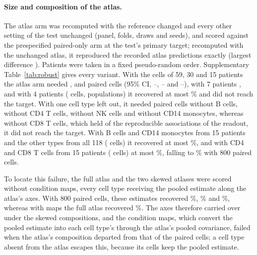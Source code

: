 \paragraph{Size and composition of the atlas.} The atlas arm was recomputed with the reference changed and every other setting of the test unchanged (panel, folds, draws and seeds), and scored against the prespecified paired-only arm at the test's primary target; recomputed with the unchanged atlas, it reproduced the recorded atlas predictions exactly (largest difference \RbReproduces). Patients were taken in a fixed pseudo-random order. Supplementary Table~\ref{tab:robust} gives every variant. With the cells of 59, 30 and 15 patients the atlas arm needed \RbCellsPatientsFiftyNine, \RbCellsPatientsThirty{} and \RbCellsPatientsFifteen{} paired cells (95\% CI, \RbCellsPatientsFiftyNineLo--\RbCellsPatientsFiftyNineHi, \RbCellsPatientsThirtyLo--\RbCellsPatientsThirtyHi{} and \RbCellsPatientsFifteenLo--\RbCellsPatientsFifteenHi), with 7 patients \RbCellsPatientsSeven, and with 4 patients (\RbCellCountPatientsFour{} cells, \RbPopsPatientsFour{} populations) it recovered at most \RbRfMaxPatientsFour\% and did not reach the target. With one cell type left out, it needed \RbCellsWithoutB{} paired cells without B cells, \RbCellsWithoutCDFourT{} without CD4 T cells, \RbCellsWithoutNK{} without NK cells and \RbCellsWithoutMono{} without CD14 monocytes, whereas without CD8 T cells, which held \BoRepCDEight{} of the \BoNRep{} reproducible associations of the readout, it did not reach the target. With B cells and CD14 monocytes from 15 patients and the other types from all 118 (\RbCellCountFewBMono{} cells) it recovered at most \RbMappedMaxFewBMono\%, and with CD4 and CD8 T cells from 15 patients (\RbCellCountFewT{} cells) at most \RbMappedMaxFewT\%, falling to \RbMappedFewT\% with 800 paired cells.

To locate this failure, the full atlas and the two skewed atlases were scored without condition maps, every cell type receiving the pooled estimate along the atlas's axes. With 800 paired cells, these estimates recovered \RbUnmapFull\%, \RbUnmapFewBMono\% and \RbUnmapFewT\%, whereas with maps the full atlas recovered \RbMappedFull\%. The axes therefore carried over under the skewed compositions, and the condition maps, which convert the pooled estimate into each cell type's through the atlas's pooled covariance, failed when the atlas's composition departed from that of the paired cells; a cell type absent from the atlas escapes this, because its cells keep the pooled estimate.

